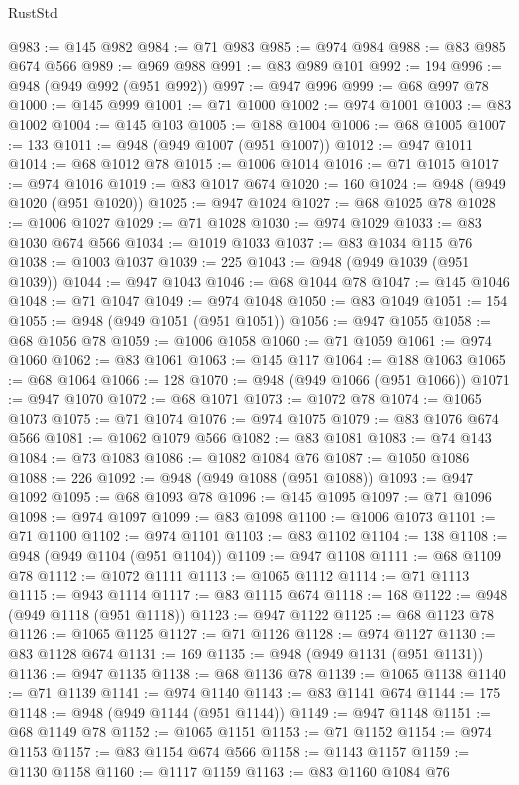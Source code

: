 \begin{lexlean}{RustStd}
\begin{coremodule}
{{@983 := @145 @982
@984 := @71 @983
@985 := @974 @984
@988 := @83 @985 @674 @566
@989 := @969 @988
@991 := @83 @989 @101
@992 := 194
@996 := @948 (@949 @992 (@951 @992))
@997 := @947 @996
@999 := @68 @997 @78
@1000 := @145 @999
@1001 := @71 @1000
@1002 := @974 @1001
@1003 := @83 @1002
@1004 := @145 @103
@1005 := @188 @1004
@1006 := @68 @1005
@1007 := 133
@1011 := @948 (@949 @1007 (@951 @1007))
@1012 := @947 @1011
@1014 := @68 @1012 @78
@1015 := @1006 @1014
@1016 := @71 @1015
@1017 := @974 @1016
@1019 := @83 @1017 @674
@1020 := 160
@1024 := @948 (@949 @1020 (@951 @1020))
@1025 := @947 @1024
@1027 := @68 @1025 @78
@1028 := @1006 @1027
@1029 := @71 @1028
@1030 := @974 @1029
@1033 := @83 @1030 @674 @566
@1034 := @1019 @1033
@1037 := @83 @1034 @115 @76
@1038 := @1003 @1037
@1039 := 225
@1043 := @948 (@949 @1039 (@951 @1039))
@1044 := @947 @1043
@1046 := @68 @1044 @78
@1047 := @145 @1046
@1048 := @71 @1047
@1049 := @974 @1048
@1050 := @83 @1049
@1051 := 154
@1055 := @948 (@949 @1051 (@951 @1051))
@1056 := @947 @1055
@1058 := @68 @1056 @78
@1059 := @1006 @1058
@1060 := @71 @1059
@1061 := @974 @1060
@1062 := @83 @1061
@1063 := @145 @117
@1064 := @188 @1063
@1065 := @68 @1064
@1066 := 128
@1070 := @948 (@949 @1066 (@951 @1066))
@1071 := @947 @1070
@1072 := @68 @1071
@1073 := @1072 @78
@1074 := @1065 @1073
@1075 := @71 @1074
@1076 := @974 @1075
@1079 := @83 @1076 @674 @566
@1081 := @1062 @1079 @566
@1082 := @83 @1081
@1083 := @74 @143
@1084 := @73 @1083
@1086 := @1082 @1084 @76
@1087 := @1050 @1086
@1088 := 226
@1092 := @948 (@949 @1088 (@951 @1088))
@1093 := @947 @1092
@1095 := @68 @1093 @78
@1096 := @145 @1095
@1097 := @71 @1096
@1098 := @974 @1097
@1099 := @83 @1098
@1100 := @1006 @1073
@1101 := @71 @1100
@1102 := @974 @1101
@1103 := @83 @1102
@1104 := 138
@1108 := @948 (@949 @1104 (@951 @1104))
@1109 := @947 @1108
@1111 := @68 @1109 @78
@1112 := @1072 @1111
@1113 := @1065 @1112
@1114 := @71 @1113
@1115 := @943 @1114
@1117 := @83 @1115 @674
@1118 := 168
@1122 := @948 (@949 @1118 (@951 @1118))
@1123 := @947 @1122
@1125 := @68 @1123 @78
@1126 := @1065 @1125
@1127 := @71 @1126
@1128 := @974 @1127
@1130 := @83 @1128 @674
@1131 := 169
@1135 := @948 (@949 @1131 (@951 @1131))
@1136 := @947 @1135
@1138 := @68 @1136 @78
@1139 := @1065 @1138
@1140 := @71 @1139
@1141 := @974 @1140
@1143 := @83 @1141 @674
@1144 := 175
@1148 := @948 (@949 @1144 (@951 @1144))
@1149 := @947 @1148
@1151 := @68 @1149 @78
@1152 := @1065 @1151
@1153 := @71 @1152
@1154 := @974 @1153
@1157 := @83 @1154 @674 @566
@1158 := @1143 @1157
@1159 := @1130 @1158
@1160 := @1117 @1159
@1163 := @83 @1160 @1084 @76
}}
\end{coremodule}
\end{lexlean}
